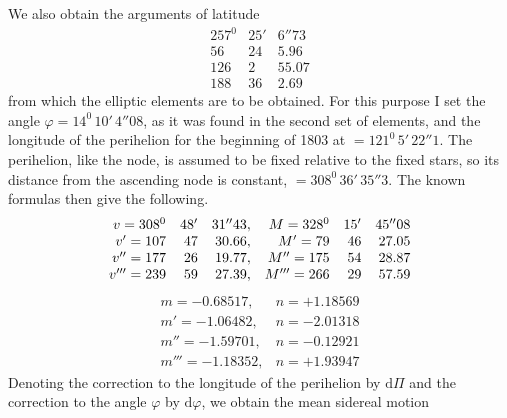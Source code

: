 We also obtain the arguments of latitude
\[
\begin{array}{rrr}
257^0&25'&6''73\\
56&24&5.96\\
126&2&55.07\\
188&36&2.69
\end{array}
\]
from which the elliptic elements are to be obtained. For this purpose I set the angle $\varphi=14^0\,10'\,4''08$, as it was found in the second set of elements, and the longitude of the perihelion for the beginning of 1803 at $=121^0\,5'\,22''1$. The perihelion, like the node, is assumed to be fixed relative to the fixed stars, so its distance from the ascending node is constant, $=308^0\,36'\,35''3$. The known formulas then give the following.
\[
\begin{array}{rrr@{\quad}rrr}
v=308^0&48'&31''43,&M=328^0&15'&45''08\\
v'=107&47&30.66,&M'=79&46&27.05\\
v''=177&26&19.77,&M''=175&54&28.87\\
v'''=239&59&27.39,&M'''=266&29&57.59
\end{array}
\]
\[
\begin{array}{ll}
m=-0.68517,&n=+1.18569\\
m'=-1.06482,&n=-2.01318\\
m''=-1.59701,&n=-0.12921\\
m'''=-1.18352,&n=+1.93947
\end{array}
\]
Denoting the correction to the longitude of the perihelion by $\mathrm d\Pi$ and the correction to the angle $\varphi$ by $\mathrm d\varphi$, we obtain the mean sidereal motion

